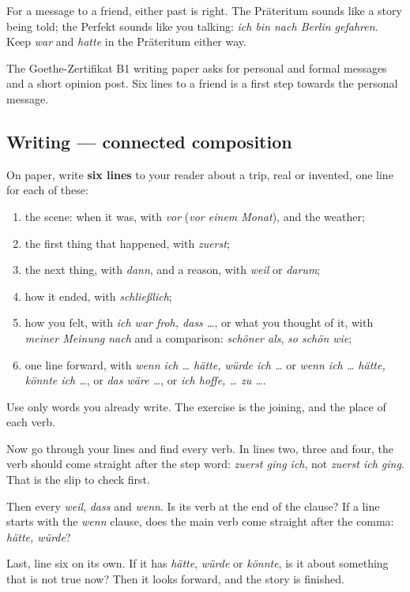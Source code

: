 For a message to a friend, either past is right. The Präteritum sounds like a story being told; the Perfekt sounds like you talking: \emph{ich bin nach Berlin gefahren}. Keep \emph{war} and \emph{hatte} in the Präteritum either way.

The Goethe-Zertifikat B1 writing paper asks for personal and formal messages and a short opinion post. Six lines to a friend is a first step towards the personal message.

\subsection*{Writing — connected composition}
On paper, write \textbf{six lines} to your reader about a trip, real or invented, one line for each of these:

\begin{enumerate}
\raggedright
  \item the scene: when it was, with \emph{vor} (\emph{vor einem Monat}), and the weather;
  \item the first thing that happened, with \emph{zuerst};
  \item the next thing, with \emph{dann}, and a reason, with \emph{weil} or \emph{darum};
  \item how it ended, with \emph{schließlich};
  \item how you felt, with \emph{ich war froh, dass …}, or what you thought of it, with \emph{meiner Meinung nach} and a comparison: \emph{schöner als}, \emph{so schön wie};
  \item one line forward, with \emph{wenn ich … hätte, würde ich …} or \emph{wenn ich … hätte, könnte ich …}, or \emph{das wäre …}, or \emph{ich hoffe, … zu …}.
\end{enumerate}

Use only words you already write. The exercise is the joining, and the place of each verb.

\begin{tcolorbox}[breakable,colback=teal!4,colframe=teal!35!black,title={Before you move on}]
Now go through your lines and find every verb. In lines two, three and four, the verb should come straight after the step word: \emph{zuerst ging ich}, not \emph{zuerst ich ging}. That is the slip to check first.

Then every \emph{weil}, \emph{dass} and \emph{wenn}. Is its verb at the end of the clause? If a line starts with the \emph{wenn} clause, does the main verb come straight after the comma: \emph{hätte, würde}?

Last, line six on its own. If it has \emph{hätte}, \emph{würde} or \emph{könnte}, is it about something that is not true now? Then it looks forward, and the story is finished.
\end{tcolorbox}

